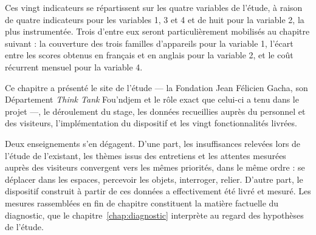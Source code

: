 Ces vingt indicateurs se répartissent sur les quatre variables de l'étude, à
raison de quatre indicateurs pour les variables 1, 3 et 4 et de huit pour la
variable 2, la plus instrumentée. Trois d'entre eux seront particulièrement
mobilisés au chapitre suivant : la couverture des trois familles d'appareils
pour la variable 1, l'écart entre les scores obtenus en français et en anglais
pour la variable 2, et le coût récurrent mensuel pour la variable 4.

\conclchap

Ce chapitre a présenté le site de l'étude — la Fondation Jean Félicien Gacha,
son Département \emph{Think Tank} Fou'ndjem et le rôle exact que celui-ci a tenu
dans le projet —, le déroulement du stage, les données recueillies auprès du
personnel et des visiteurs, l'implémentation du dispositif et les vingt
fonctionnalités livrées.

Deux enseignements s'en dégagent. D'une part, les insuffisances relevées lors de
l'étude de l'existant, les thèmes issus des entretiens et les attentes mesurées
auprès des visiteurs convergent vers les mêmes priorités, dans le même ordre :
se déplacer dans les espaces, percevoir les objets, interroger, relier. D'autre
part, le dispositif construit à partir de ces données a effectivement été livré
et mesuré. Les mesures rassemblées en fin de chapitre constituent la matière
factuelle du diagnostic, que le chapitre~\ref{chap:diagnostic} interprète au
regard des hypothèses de l'étude.
